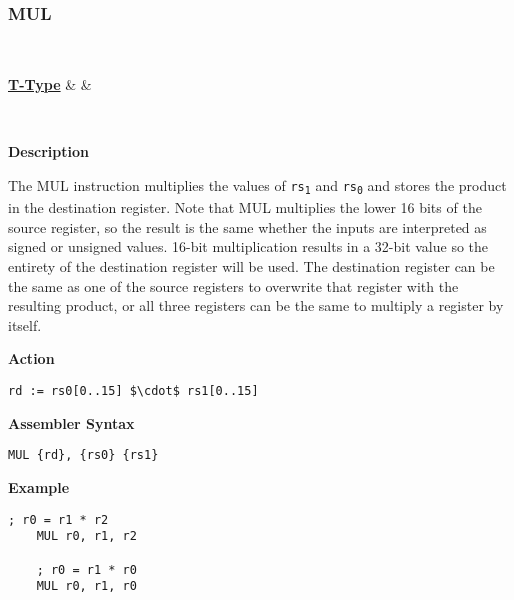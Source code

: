 \subsubsection{MUL }\label{sec:MUL}

\vspace{3ex}

\begin{center}
	\begin{bytefield}[leftcurly=., leftcurlyspace=0pt]{32}
		 \\
		\begin{leftwordgroup}{\hyperref[sec:t-type]{\textbf{T-Type}}}
		 & 
		 &
		\end{leftwordgroup}\\
	\end{bytefield}
\end{center}

\textbf{Description}

The MUL instruction multiplies the values of \texttt{rs\textsubscript{1}} and \texttt{rs\textsubscript{0}} and stores the product in the destination register.
Note that MUL multiplies the lower 16 bits of the source register, so the result is the same whether the inputs are interpreted as signed or unsigned values.
16-bit multiplication results in a 32-bit value so the entirety of the destination register will be used.
The destination register can be the same as one of the source registers to overwrite that register with the resulting product,
or all three registers can be the same to multiply a register by itself.
\vspace{3ex}

\textbf{Action}
\begin{lstlisting}[frame=single]
	rd := rs0[0..15] $\cdot$ rs1[0..15]
\end{lstlisting}

\vspace{3ex}

\textbf{Assembler Syntax}
\begin{lstlisting}[frame=single]
	MUL {rd}, {rs0} {rs1}
\end{lstlisting}

\vspace{3ex}

\textbf{Example}
\begin{lstlisting}[frame=single]
	; r0 = r1 * r2
	MUL r0, r1, r2
	
	; r0 = r1 * r0
	MUL r0, r1, r0
\end{lstlisting} 

